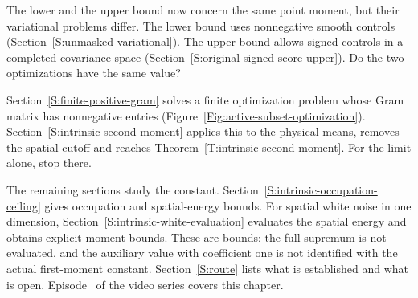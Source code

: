 The lower and the upper bound now concern the same point moment, but
their variational problems differ. The lower bound uses nonnegative
smooth controls (Section~\ref{S:unmasked-variational}). The
upper bound allows signed controls in a completed covariance space
(Section~\ref{S:original-signed-score-upper}). Do the two optimizations have
the same value?

Section~\ref{S:finite-positive-gram} solves a finite
optimization problem whose Gram matrix has nonnegative
entries (Figure~\ref{Fig:active-subset-optimization}).
Section~\ref{S:intrinsic-second-moment} applies this to
the physical means, removes the spatial cutoff and reaches
Theorem~\ref{T:intrinsic-second-moment}. For the limit alone, stop there.

The remaining sections study the
constant. Section~\ref{S:intrinsic-occupation-ceiling} gives occupation
and spatial-energy bounds. For spatial white noise in one dimension,
Section~\ref{S:intrinsic-white-evaluation} evaluates the spatial energy and
obtains explicit moment bounds. These are bounds: the full supremum is not
evaluated, and the auxiliary value with coefficient one is not identified
with the actual first-moment constant. Section~\ref{S:route} lists what is
established and what is open. Episode~ of the video
series covers this chapter.
